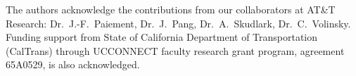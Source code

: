 The authors acknowledge the contributions from our collaborators at AT\&T Research: Dr.~J.-F.~Paiement, Dr.~J.~Pang, Dr.~A.~Skudlark, Dr.~C.~Volinsky. Funding support from State of California Department of Transportation (CalTrans) through UCCONNECT faculty research grant program, agreement 65A0529, is also acknowledged.





